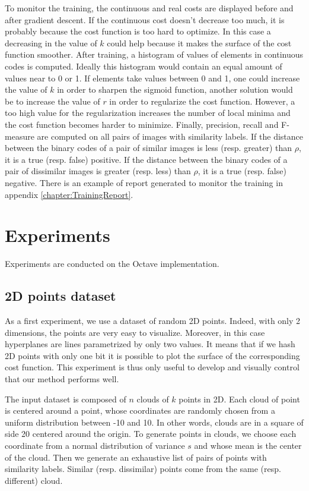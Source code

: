 To monitor the training, the continuous and real costs are displayed before and after gradient descent. If the continuous cost doesn't decrease too much, it is probably because the cost function is too hard to optimize. In this case a decreasing in the value of $k$ could help because it makes the surface of the cost function smoother. After training, a histogram of values of elements in continuous codes is computed. Ideally this histogram would contain an equal amount of values near to 0 or 1. If elements take values between 0 and 1, one could increase the value of $k$ in order to sharpen the sigmoid function, another solution would be to increase the value of $r$ in order to regularize the cost function. However, a too high value for the regularization increases the number of local minima and the cost function becomes harder to minimize. Finally, precision, recall and F-measure are computed on all pairs of images with similarity labels. If the distance between the binary codes of a pair of similar images is less (resp. greater) than $\rho$, it is a true (resp. false) positive. If the distance between the binary codes of a pair of dissimilar images is greater (resp. less) than $\rho$, it is a true (resp. false) negative. There is an example of report generated to monitor the training in appendix \ref{chapter:TrainingReport}.

\section{Experiments}
Experiments are conducted on the Octave implementation.

\subsection{2D points dataset}
As a first experiment, we use a dataset of random 2D points. Indeed, with only 2 dimensions, the points are very easy to visualize. Moreover, in this case hyperplanes are lines parametrized by only two values. It means that if we hash 2D points with only one bit it is possible to plot the surface of the corresponding cost function. This experiment is thus only useful to develop and visually control that our method performs well.

The input dataset is composed of $n$ clouds of $k$ points in 2D. Each cloud of point is centered around a point, whose coordinates are randomly chosen from a uniform distribution between -10 and 10. In other words, clouds are in a square of side 20 centered around the origin. To generate points in clouds, we choose each coordinate from a normal distribution of variance $s$ and whose mean is the center of the cloud. Then we generate an exhaustive list of pairs of points with similarity labels. Similar (resp. dissimilar) points come from the same (resp. different) cloud.

